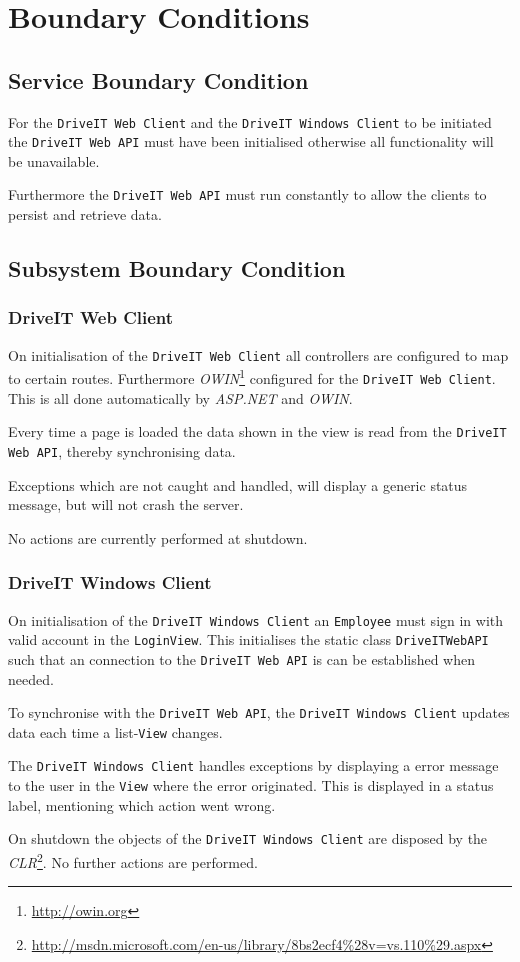 \section{Boundary Conditions}
\subsection{Service Boundary Condition}
For the \texttt{DriveIT Web Client} and the \texttt{DriveIT Windows Client} to be initiated the \texttt{DriveIT Web API} must have been initialised otherwise all functionality will be unavailable. 

Furthermore the \texttt{DriveIT Web API} must run constantly to allow the clients to persist and retrieve data.

\subsection{Subsystem Boundary Condition}
\subsubsection{DriveIT Web Client}
On initialisation of the \texttt{DriveIT Web Client} all controllers are configured to map to certain routes. Furthermore \textit{OWIN}\footnote{\url{http://owin.org}} configured for the \texttt{DriveIT Web Client}. This is all done automatically by \textit{ASP.NET} and \textit{OWIN}. 

Every time a page is loaded the data shown in the view is read from the \texttt{DriveIT Web API}, thereby synchronising data.

Exceptions which are not caught and handled, will display a generic status message, but will not crash the server.

No actions are currently performed at shutdown.

\subsubsection{DriveIT Windows Client}
On initialisation of the \texttt{DriveIT Windows Client} an \texttt{Employee} must sign in with valid account in the \texttt{LoginView}. This initialises the static class \texttt{DriveITWebAPI} such that an connection to the \texttt{DriveIT Web API} is can be established when needed.

To synchronise with the \texttt{DriveIT Web API}, the \texttt{DriveIT Windows Client} updates data each time a list-\texttt{View} changes.

The \texttt{DriveIT Windows Client} handles exceptions by displaying a error message to the user in the \texttt{View} where the error originated. This is displayed in a status label, mentioning which action went wrong.

On shutdown the objects of the \texttt{DriveIT Windows Client} are disposed by the \textit{CLR}\footnote{\url{http://msdn.microsoft.com/en-us/library/8bs2ecf4\%28v=vs.110\%29.aspx}}. No further actions are performed.